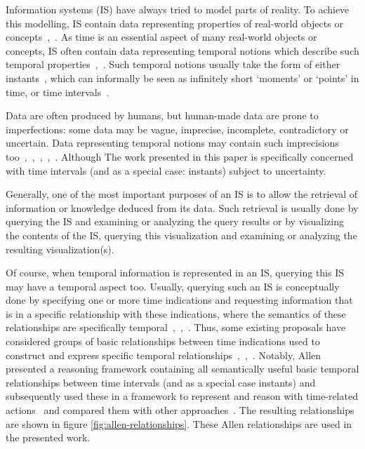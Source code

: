 Information systems (IS) have always tried to model parts of reality. To achieve this modelling, IS contain data representing properties of real-world objects or concepts~\cite{JoseEnriquePons2012},~\cite{Billiet2012}. As time is an essential aspect of many real-world objects or concepts, IS often contain data representing temporal notions which describe such temporal properties~\cite{Bolour1982},~\cite{VanderCruyssen1997}. Such temporal notions usually take the form of either instants~\cite{Jensen1998}, which can informally be seen as infinitely short `moments' or `points' in time, or time intervals~\cite{Jensen1998}.

Data are often produced by humans, but human-made data are prone to imperfections: some data may be vague, imprecise, incomplete, contradictory or uncertain. Data representing temporal notions may contain such imprecisions too~\cite{JoseEnriquePons2012},~\cite{Billiet2012},~\cite{VanderCruyssen1997},~\cite{Devos1994},~\cite{Dubois2003}. Although The work presented in this paper is specifically concerned with time intervals (and as a special case: instants) subject to uncertainty.

Generally, one of the most important purposes of an IS is to allow the retrieval of information or knowledge deduced from its data. Such retrieval is usually done by querying the IS and examining or analyzing the query results or by visualizing the contents of the IS, querying this visualization and examining or analyzing the resulting visualization(s).

Of course, when temporal information is represented in an IS, querying this IS may have a temporal aspect too. Usually, querying such an IS is conceptually done by specifying one or more time indications and requesting information that is in a specific relationship with these indications, where the semantics of these relationships are specifically temporal~\cite{JoseEnriquePons2012},~\cite{Billiet2012},~\cite{Pons2012a}. Thus, some existing proposals have considered groups of basic relationships between time indications used to construct and express specific temporal relationships~\cite{Medina1994},~\cite{Schockaert2008},~\cite{Dubois2007}. Notably, Allen~\cite{Allen1983} presented a reasoning framework containing all semantically useful basic temporal relationships between time intervals (and as a special case instants) and subsequently used these in a framework to represent and reason with time-related actions~\cite{Allen1984} and compared them with other approaches~\cite{Allen1991}. The resulting relationships are shown in figure \ref{fig:allen-relationships}. These Allen relationships are used in the presented work.

